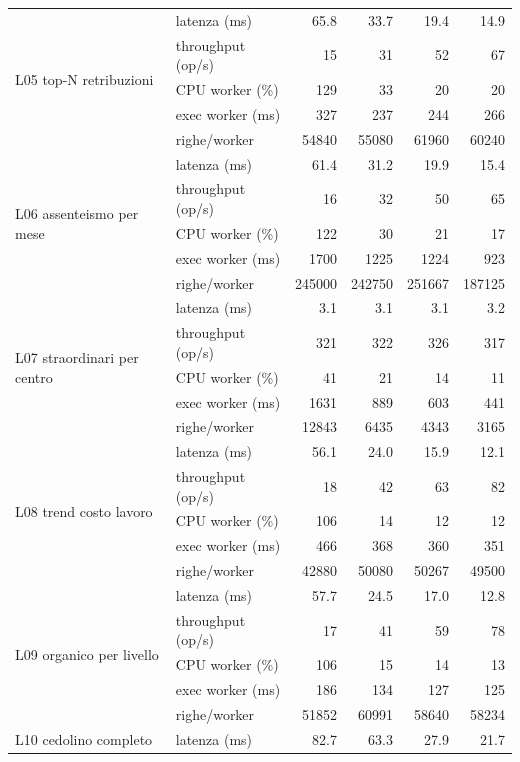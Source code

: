 \begin{longtable}{@{}llrrrr@{}}
\multirow{5}{*}{L05 top-N retribuzioni} & latenza (ms)     & 65.8 & 33.7 & 19.4 & 14.9 \\
 & throughput (op/s) & 15 & 31 & 52 & 67 \\
 & CPU worker (\%)   & 129 & 33 & 20 & 20 \\
 & exec worker (ms)  & 327 & 237 & 244 & 266 \\
 & righe/worker      & 54840 & 55080 & 61960 & 60240 \\ \midrule
\multirow{5}{*}{L06 assenteismo per mese} & latenza (ms)     & 61.4 & 31.2 & 19.9 & 15.4 \\
 & throughput (op/s) & 16 & 32 & 50 & 65 \\
 & CPU worker (\%)   & 122 & 30 & 21 & 17 \\
 & exec worker (ms)  & 1700 & 1225 & 1224 & 923 \\
 & righe/worker      & 245000 & 242750 & 251667 & 187125 \\ \midrule
\multirow{5}{*}{L07 straordinari per centro} & latenza (ms)     & 3.1 & 3.1 & 3.1 & 3.2 \\
 & throughput (op/s) & 321 & 322 & 326 & 317 \\
 & CPU worker (\%)   & 41 & 21 & 14 & 11 \\
 & exec worker (ms)  & 1631 & 889 & 603 & 441 \\
 & righe/worker      & 12843 & 6435 & 4343 & 3165 \\ \midrule
\multirow{5}{*}{L08 trend costo lavoro} & latenza (ms)     & 56.1 & 24.0 & 15.9 & 12.1 \\
 & throughput (op/s) & 18 & 42 & 63 & 82 \\
 & CPU worker (\%)   & 106 & 14 & 12 & 12 \\
 & exec worker (ms)  & 466 & 368 & 360 & 351 \\
 & righe/worker      & 42880 & 50080 & 50267 & 49500 \\ \midrule
\multirow{5}{*}{L09 organico per livello} & latenza (ms)     & 57.7 & 24.5 & 17.0 & 12.8 \\
 & throughput (op/s) & 17 & 41 & 59 & 78 \\
 & CPU worker (\%)   & 106 & 15 & 14 & 13 \\
 & exec worker (ms)  & 186 & 134 & 127 & 125 \\
 & righe/worker      & 51852 & 60991 & 58640 & 58234 \\ \midrule
\multirow{5}{*}{L10 cedolino completo} & latenza (ms)     & 82.7 & 63.3 & 27.9 & 21.7 \\

\end{longtable}
